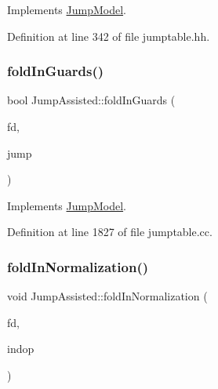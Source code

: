 Implements \mbox{\hyperlink{class_jump_model_aac83f52fbf3ee566e760dfabe6e67ee6}{Jump\+Model}}.



Definition at line 342 of file jumptable.\+hh.

\mbox{\label{class_jump_assisted_a9162ab4e23d4d31e7b16e46a42442a98}} 
\subsubsection{\texorpdfstring{foldInGuards()}{foldInGuards()}}
{\footnotesize\ttfamily bool Jump\+Assisted\+::fold\+In\+Guards (\begin{DoxyParamCaption}\item[{\mbox{\hyperlink{class_funcdata}{Funcdata}} $\ast$}]{fd,  }\item[{\mbox{\hyperlink{class_jump_table}{Jump\+Table}} $\ast$}]{jump }\end{DoxyParamCaption})\hspace{0.3cm}{\ttfamily [virtual]}}



Implements \mbox{\hyperlink{class_jump_model_a6f40ba77ddc8f4cf40f6071248103d9c}{Jump\+Model}}.



Definition at line 1827 of file jumptable.\+cc.

\mbox{\label{class_jump_assisted_aa9732767f921501368f90bd0d1defa1a}} 
\subsubsection{\texorpdfstring{foldInNormalization()}{foldInNormalization()}}
{\footnotesize\ttfamily void Jump\+Assisted\+::fold\+In\+Normalization (\begin{DoxyParamCaption}\item[{\mbox{\hyperlink{class_funcdata}{Funcdata}} $\ast$}]{fd,  }\item[{\mbox{\hyperlink{class_pcode_op}{Pcode\+Op}} $\ast$}]{indop }\end{DoxyParamCaption})\hspace{0.3cm}{\ttfamily [virtual]}}



